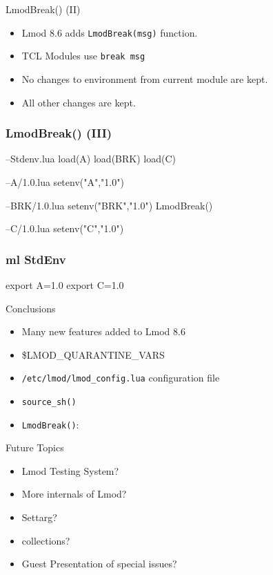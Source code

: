 \documentclass{beamer}
\begin{document}
\begin{frame}{LmodBreak() (II)}
  \begin{itemize}
    \item Lmod 8.6 adds \texttt{LmodBreak(msg)} function. 
    \item TCL Modules use \texttt{break msg}
    \item No changes to environment from current module are kept.
    \item All other changes are kept.
  \end{itemize}
\end{frame}

\begin{frame}[fragile]
  \frametitle{LmodBreak() (III)}
    {\tiny
\begin{semiverbatim}
--Stdenv.lua
load(A)
load(BRK)
load(C)

--A/1.0.lua
setenv("A","1.0")

--BRK/1.0.lua
setenv("BRK","1.0")
LmodBreak()

--C/1.0.lua
setenv("C","1.0")
\end{semiverbatim}
    }
\end{frame}

\begin{frame}[fragile]
  \frametitle{ml StdEnv}
    {\tiny
\begin{semiverbatim}
    export A=1.0
    export C=1.0
\end{semiverbatim}
    }
\end{frame}

\begin{frame}{Conclusions}
  \begin{itemize}
    \item Many new features added to Lmod 8.6
    \item \$LMOD\_QUARANTINE\_VARS
    \item \texttt{/etc/lmod/lmod\_config.lua} configuration file
    \item \texttt{source\_sh()} 
    \item \texttt{LmodBreak()}: 
  \end{itemize}
\end{frame}

\begin{frame}{Future Topics}
  \begin{itemize}
    \item Lmod Testing System?
    \item More internals of Lmod?
    \item Settarg?
    \item collections?
    \item Guest Presentation of special issues?
  \end{itemize}
\end{frame}
\end{document}
